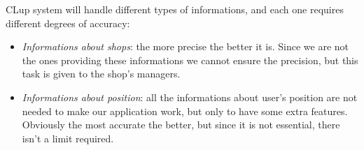 CLup system will handle different types of informations, and each one requires different degrees of accuracy:
\begin{itemize}[topsep=0pt]
    \item \textit{Informations about shops}: the more precise the better it is. Since we are not the ones providing these informations we cannot ensure the precision, but this task is given to the shop's managers.
    \item \textit{Informations about position}: all the informations about user's position are not needed to make our application work, but only to have some extra features. Obviously the most accurate the better, but since it is not essential, there isn't a limit required.
\end{itemize}